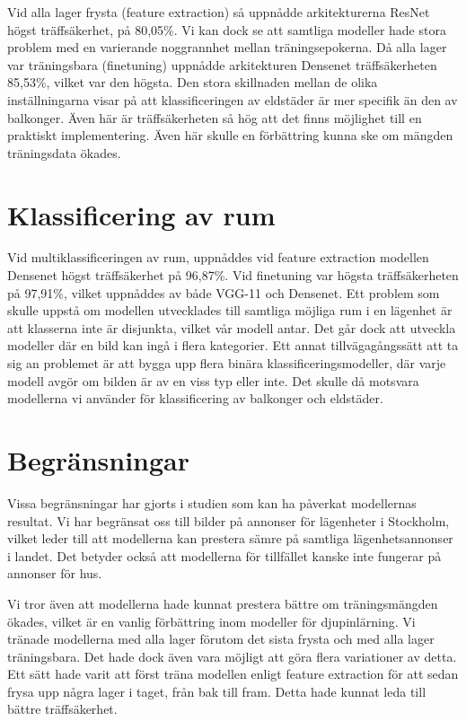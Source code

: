 \documentclass[]{kththesis}
\begin{document}
Vid alla lager frysta (feature extraction) så uppnådde arkitekturerna ResNet högst träffsäkerhet, på 80,05\%. Vi kan dock se att samtliga modeller hade stora problem med en varierande noggrannhet mellan träningsepokerna. Då alla lager var träningsbara (finetuning) uppnådde arkitekturen Densenet träffsäkerheten 85,53\%, vilket var den högsta. Den stora skillnaden mellan de olika inställningarna visar på att klassificeringen av eldstäder är mer specifik än den av balkonger. Även här är träffsäkerheten så hög att det finns möjlighet till en praktiskt implementering. Även här skulle en förbättring kunna ske om mängden träningsdata ökades.

\section{Klassificering av rum}
Vid multiklassificeringen av rum, uppnåddes vid feature extraction modellen Densenet högst träffsäkerhet på 96,87\%. Vid finetuning var högsta träffsäkerheten på 97,91\%, vilket uppnåddes av både VGG-11 och Densenet. Ett problem som skulle uppstå om modellen utvecklades till samtliga möjliga rum i en lägenhet är att klasserna inte är disjunkta, vilket vår modell antar. Det går dock att utveckla modeller där en bild kan ingå i flera kategorier. Ett annat tillvägagångssätt att ta sig an problemet är att bygga upp flera binära klassificeringsmodeller, där varje modell avgör om bilden är av en viss typ eller inte. Det skulle då motsvara modellerna vi använder för klassificering av balkonger och eldstäder. 

\section{Begränsningar}
Vissa begränsningar har gjorts i studien som kan ha påverkat modellernas resultat. Vi har begränsat oss till bilder på annonser för lägenheter i Stockholm, vilket leder till att modellerna kan prestera sämre på samtliga lägenhetsannonser i landet. Det betyder också att modellerna för tillfället kanske inte fungerar på annonser för hus.

Vi tror även att modellerna hade kunnat prestera bättre om träningsmängden ökades, vilket är en vanlig förbättring inom modeller för djupinlärning. Vi tränade modellerna med alla lager förutom det sista frysta och med alla lager träningsbara. Det hade dock även vara möjligt att göra flera variationer av detta. Ett sätt hade varit att först träna modellen enligt feature extraction för att sedan frysa upp några lager i taget, från bak till fram. Detta hade kunnat leda till bättre träffsäkerhet. 
\end{document}
